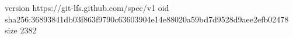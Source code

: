 version https://git-lfs.github.com/spec/v1
oid sha256:36893841db03f863f9790c63603904e14e88020a59bd7d9528d9aee2efb02478
size 2382
